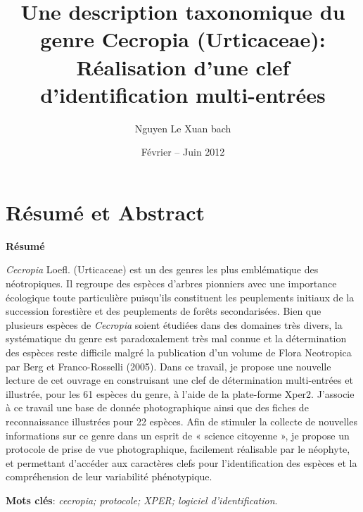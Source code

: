 \documentclass[a4paper]{article}
\title{Une description taxonomique du genre Cecropia (Urticaceae): Réalisation
d'une clef d'identification multi-entrées}
\author{Nguyen Le Xuan bach}
\date{Février -- Juin 2012}
\theoremstyle{definition}
\theoremstyle{definition}
\theoremstyle{definition}
\theoremstyle{remark}
\begin{document}

\maketitle



{
\hypersetup{linkcolor=black}
\setcounter{tocdepth}{2}
\newpage
\tableofcontents
}
\newpage
{}

\section*{Résumé et Abstract}\label{resume-et-abstract}

\textbf{Résumé}

\emph{Cecropia} Loefl. (Urticaceae) est un des genres les plus
emblématique des néotropiques. Il regroupe des espèces d'arbres
pionniers avec une importance écologique toute particulière puisqu'ils
constituent les peuplements initiaux de la succession forestière et des
peuplements de forêts secondarisées. Bien que plusieurs espèces de
\emph{Cecropia} soient étudiées dans des domaines très divers, la
systématique du genre est paradoxalement très mal connue et la
détermination des espèces reste difficile malgré la publication d'un
volume de Flora Neotropica par Berg et Franco-Rosselli (2005). Dans ce
travail, je propose une nouvelle lecture de cet ouvrage en construisant
une clef de détermination multi-entrées et illustrée, pour les 61
espèces du genre, à l'aide de la plate-forme Xper2. J'associe à ce
travail une base de donnée photographique ainsi que des fiches de
reconnaissance illustrées pour 22 espèces. Afin de stimuler la collecte
de nouvelles informations sur ce genre dans un esprit de « science
citoyenne », je propose un protocole de prise de vue photographique,
facilement réalisable par le néophyte, et permettant d'accéder aux
caractères clefs pour l'identification des espèces et la compréhension
de leur variabilité phénotypique.

\textbf{Mots clés}: \emph{cecropia; protocole; XPER; logiciel
d'identification}.
\end{document}
